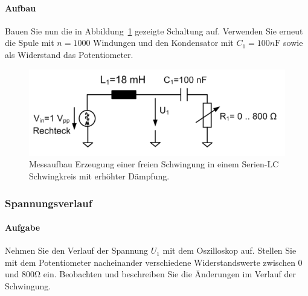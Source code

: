 \documentclass[10pt]{scrreprt}
\begin{document}
        \paragraph{Aufbau}
        Bauen Sie nun die in Abbildung~\ref{fig:abb17} gezeigte Schaltung auf. Verwenden Sie erneut
        die Spule mit $n = 1000$ Windungen und den Kondensator mit $C_1 = 100\si{n\farad}$ sowie
        als Widerstand das Potentiometer.
        \begin{center}
            \begin{figure}[H]
                \includegraphics[width=\textwidth]{Abbildung17.png}
                \caption{Messaufbau Erzeugung einer freien Schwingung in einem Serien-LC Schwingkreis
                        mit erhöhter Dämpfung.}
                \label{fig:abb17}
            \end{figure}
        \end{center}

        \subsubsection{Spannungsverlauf}
        \paragraph{Aufgabe}
        Nehmen Sie den Verlauf der Spannung $U_1$ mit dem Oszilloskop auf. Stellen Sie
        mit dem Potentiometer nacheinander verschiedene Widerstandswerte zwischen
        $0$ und $800\si{\ohm}$ ein. Beobachten und beschreiben Sie die Änderungen im Verlauf
        der Schwingung.
\end{document}
